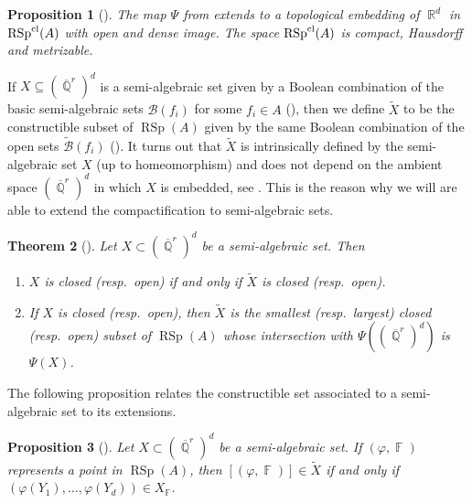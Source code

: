 \documentclass{amsart}
\theoremstyle{plain}
\newtheorem{proposition}{Proposition}[section]
\newtheorem{theorem}[proposition]{Theorem}
\theoremstyle{definition}
\DeclareMathOperator{\rsp}{RSp}
\DeclareMathOperator{\RSp}{RSp}
\DeclareMathOperator{\Fb}{{\mathbb{F}}}
\DeclareMathOperator{\Rb}{{\mathbb{R}}}
\DeclareMathOperator{\Qb}{\mathbb{Q}}
\newcommand{\cl}{\textnormal{cl}}
\newcommand{\1}{\mathbf{1}}
\begin{document}
\begin{proposition}[{\cite[Proposition 2.33]{BurgerIozziParreauPozzetti_RSCCharacterVarieties2}}]
\label{propo_ImageVRInRealSpec}
    The map $\Psi$ from  extends to a topological embedding of $\Rb^d$ in $\rsp^\cl(A)$ with open and dense image.
    The space $\rsp^\cl(A)$ is compact, Hausdorff and metrizable.
\end{proposition}

If $X \subseteq (\overline{\Qb}^r)^d$ is a semi-algebraic set given by a Boolean combination of the basic semi-algebraic sets $\mathcal{B}(f_i)$ for some $f_i \in A$ (), then we define $\widetilde{X}$ to be the constructible subset of $\rsp(A)$ given by the same Boolean combination of the open sets $\widetilde{\mathcal{B}}(f_i)$ ().
It turns out that $\widetilde{X}$ is intrinsically defined by the semi-algebraic set $X$ (up to homeomorphism) and does not depend on the ambient space $(\overline{\Qb}^r)^d$ in which $X$ is embedded, see \cite[Corollary 7.2.4, Remark 7.2.5]{BochnakCosteRoy_RealAlgebraicGeometry}.
This is the reason why we will are able to extend the compactification to semi-algebraic sets.

\begin{theorem}[{\cite[Theorem 7.2.3, Proposition 7.2.7]{BochnakCosteRoy_RealAlgebraicGeometry}}]
\label{thm_SemiAlgSetsConstructibleSubsets}
    Let $X \subset (\overline{\Qb}^r)^d$ be a semi-algebraic set.
    Then
\begin{enumerate}
    \item 
    \label{item_thm_SemiAlgSetsConstructibleSubsets}
    $X$ is closed (resp.\ open) if and only if $\widetilde{X}$ is closed (resp.\ open).
    \item 
    \label{propo_CharTilde}
    If $X$ is closed (resp.\ open), then $\widetilde{X}$ is the smallest (resp.\ largest) closed (resp.\ open) subset of $\rsp(A)$ whose intersection with $\Psi((\overline{\Qb}^r)^d)$ is $\Psi(X)$.
\end{enumerate}
\end{theorem}


The following proposition relates the constructible set associated to a semi-algebraic set to its extensions.

\begin{proposition}[{\cite[Proposition 4.1.10]{Scheiderer_RAG}}]
\label{propo: Characterizing closures of closed semi-algebraic sets}
    Let $X \subset (\overline{\Qb}^r)^d$ be a semi-algebraic set.
    If $(\varphi,\Fb)$ represents a point in $\RSp(A)$, then $[(\varphi,\Fb)] \in \widetilde{X}$ if and only if $(\varphi(Y_1),\ldots, \varphi(Y_d)) \in X_{\Fb}$.
\end{proposition}
\end{document}
